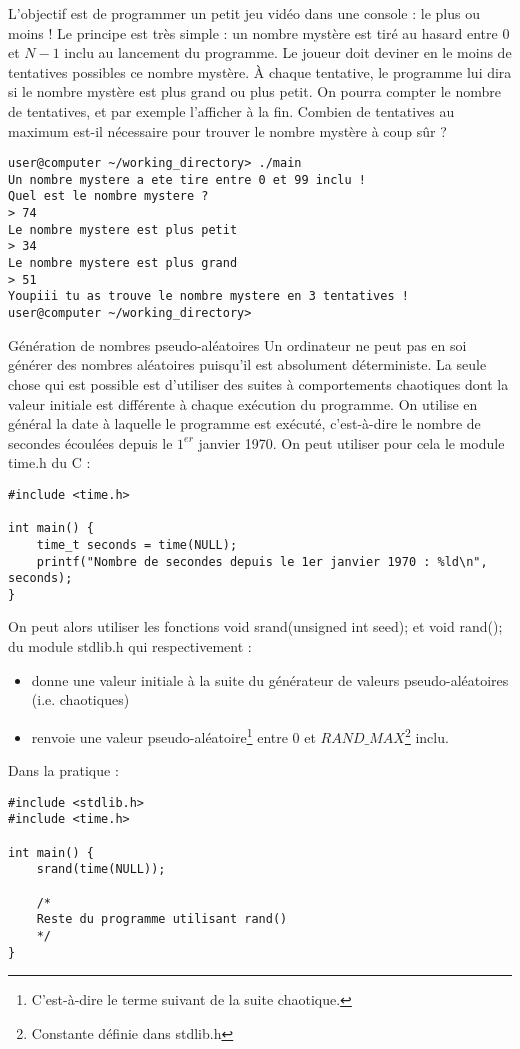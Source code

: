 \documentclass[../../../main.tex]{subfiles}
\begin{document}
 L'objectif est de programmer un petit jeu vidéo dans une console : le plus ou moins ! Le principe est très simple : un nombre mystère est tiré au hasard entre $0$ et $N-1$ inclu au lancement du programme. Le joueur doit deviner en le moins de tentatives possibles ce nombre mystère. À chaque tentative, le programme lui dira si le nombre mystère est plus grand ou plus petit. On pourra compter le nombre de tentatives, et par exemple l'afficher à la fin. Combien de tentatives au maximum est-il nécessaire pour trouver le nombre mystère à coup sûr ?
\begin{verbatim}
user@computer ~/working_directory> ./main
Un nombre mystere a ete tire entre 0 et 99 inclu !
Quel est le nombre mystere ?
> 74
Le nombre mystere est plus petit
> 34
Le nombre mystere est plus grand
> 51
Youpiii tu as trouve le nombre mystere en 3 tentatives !
user@computer ~/working_directory>
\end{verbatim}
\begin{minitelbasicbox}{Génération de nombres pseudo-aléatoires}
Un ordinateur ne peut pas en soi générer des nombres aléatoires puisqu'il est absolument déterministe. La seule chose qui est possible est d'utiliser des suites à comportements chaotiques dont la valeur initiale est différente à chaque exécution du programme. On utilise en général la date à laquelle le programme est exécuté, c'est-à-dire le nombre de secondes écoulées depuis le $1^{er}$ janvier 1970. On peut utiliser pour cela le module \textsf{time.h} du C :
\begin{verbatim}
#include <time.h>

int main() {
	time_t seconds = time(NULL);
	printf("Nombre de secondes depuis le 1er janvier 1970 : %ld\n", seconds);
}
\end{verbatim}
On peut alors utiliser les fonctions \textsf{void srand(unsigned int seed);} et \textsf{void rand();} du module \textsf{stdlib.h} qui respectivement :
\begin{itemize}
	\item donne une valeur initiale à la suite du générateur de valeurs pseudo-aléatoires (i.e. chaotiques)
	\item renvoie une valeur pseudo-aléatoire\footnote{C'est-à-dire le terme suivant de la suite chaotique.} entre $0$ et $RAND\_MAX$\footnote{Constante définie dans \textsf{stdlib.h}} inclu.
\end{itemize}
Dans la pratique :
\begin{verbatim}
#include <stdlib.h>
#include <time.h>

int main() {
	srand(time(NULL));

	/*
	Reste du programme utilisant rand()
	*/
}
\end{verbatim}
\end{minitelbasicbox}
\end{document}
